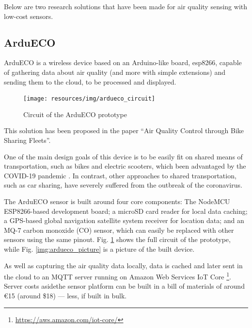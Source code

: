		Below are two research solutions that have been made for air quality sensing with low-cost sensors.
			
		\subsection{ArduECO}
			
			ArduECO is a wireless device based on an Arduino-like board, esp8266, capable of gathering data about air quality (and more with simple extensions) and sending them to the cloud, to be processed and displayed.

			\begin{figure}
				\centering
				\texttt{[image: resources/img/ardueco\_circuit]}
				\caption{Circuit of the ArduECO prototype}
				\label{img:ardueco_circuit}
			\end{figure}
			
			This solution has been proposed in the paper ``Air Quality Control through Bike Sharing Fleets''\cite{ardueco_paper}.
			
			One of the main design goals of this device is to be easily fit on shared means of transportation, such as bikes and electric scooters, which been advantaged by the COVID-19 pandemic \cite{HU2021102997}.
			In contrast, other approaches to shared transportation, such as car sharing, have severely suffered from the outbreak of the coronavirus.
			
			The ArduECO sensor is built around four core components: The NodeMCU ESP8266-based development board; a microSD card reader for local data caching; a GPS-based global navigation satellite system receiver for location data; and an MQ-7 carbon monoxide (CO) sensor, which can easily be replaced with other sensors using the same pinout.
			Fig. \ref{img:ardueco_circuit} shows the full circuit of the prototype, while Fig. \ref{img:ardueco_picture} is a picture of the built device.
			
			As well as capturing the air quality data locally, data is cached and later sent in the cloud to an MQTT server running on Amazon Web Services IoT Core \footnote{\url{https://aws.amazon.com/iot-core/}}.
			Server costs asidethe sensor platform can be built in a bill of materials of around €15 (around \$18) — less, if built in bulk.
			
